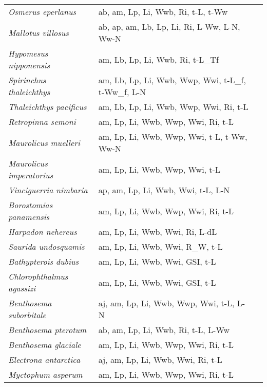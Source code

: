 {\begin{longtable}[c]{p{3.5cm}p{5.5cm}p{5.5cm}}
\emph{Osmerus eperlanus} &  ab, am, Lp, Li, Wwb, Ri, t-L, t-Ww & \citet{QuigIgoe2004,KorlMukh2009} \\
\emph{Mallotus villosus} &  ab, ap, am, Lb, Lp, Li, Ri, L-Ww, L-N, Ww-N & \citet{JohaVilh1999} \\
\emph{Hypomesus nipponensis} &  am, Lb, Lp, Li, Wwb, Ri, t-L\_Tf & \citet{KudoMizu2000} \\
\emph{Spirinchus thaleichthys} &  am, Lb, Lp, Li, Wwb, Wwp, Wwi, t-L\_f, t-Ww\_f, L-N & \citet{ChigSibl1994} \\
\emph{Thaleichthys pacificus} &  am, Lb, Lp, Li, Wwb, Wwp, Wwi, Ri, t-L & \citet{ChigSibl1994,ClarLewi2007} \\
\emph{Retropinna semoni} &  am, Lp, Li, Wwb, Wwp, Wwi, Ri, t-L & \citet{MiltArth1985} \\
\emph{Maurolicus muelleri} &  am, Lp, Li, Wwb, Wwp, Wwi, t-L, t-Ww, Ww-N & \citet{GoodGisk1995,MunkNiel2005} \\
\emph{Maurolicus imperatorius} &  am, Lp, Li, Wwb, Wwp, Wwi, t-L & \citet{SaviBayt2010} \\
\emph{Vinciguerria nimbaria} &  ap, am, Lp, Li, Wwb, Wwi, t-L, L-N & \citet{SteqMena2003,TomaPanf2000} \\
\emph{Borostomias panamensis} &  am, Lp, Li, Wwb, Wwp, Wwi, Ri, t-L & \citet{ChilTayl1980} \\
\emph{Harpadon nehereus} &  am, Lp, Li, Wwb, Wwi, Ri, L-dL & \citet{FirdSoem2017,Ghos2014} \\
\emph{Saurida undosquamis} &  am, Lp, Li, Wwb, Wwi, R\_W, t-L & \citet{YoneSaka2002,HalfAmin2007,KadhMoha2013} \\
\emph{Bathypterois dubius} &  am, Lp, Li, Wwb, Wwi, GSI, t-L & \citet{MoraMass1996,PorcFoll2010} \\
\emph{Chlorophthalmus agassizi} &  am, Lp, Li, Wwb, Wwi, GSI, t-L & \citet{AnasPapa2006,CabiFoll2010} \\
\emph{Benthosema suborbitale} &  aj, am, Lp, Li, Wwb, Wwp, Wwi, t-L, L-N & \citet{Gart1991,Gart1993} \\
\emph{Benthosema pterotum} &  ab, am, Lp, Li, Wwb, Ri, t-L, L-Ww & \citet{GjosTils1988,HossVali2015} \\
\emph{Benthosema glaciale} &  am, Lp, Li, Wwb, Wwp, Wwi, Ri, t-L & \citet{Gjos1973} \\
\emph{Electrona antarctica} &  aj, am, Lp, Li, Wwb, Wwi, Ri, t-L & \citet{GreeGart1999} \\
\emph{Myctophum asperum} &  am, Lp, Li, Wwb, Wwp, Wwi, Ri, t-L & \citet{HayaWata2001} \\

\end{longtable}}
